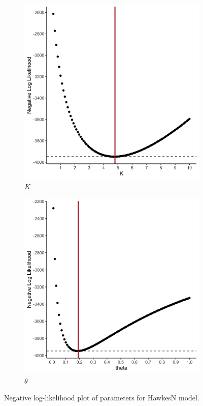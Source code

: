 \documentclass[12pt]{article}
\begin{document}
\begin{figure}
\centering
\begin{subfigure}{.5\textwidth}
  \centering
  \includegraphics[width=0.9\linewidth]{../figures/HawkesN_neg-log-likelihood-plot_K.png}
  \caption{$K$}
\end{subfigure}%
\begin{subfigure}{.5\textwidth}
  \centering
  \includegraphics[width=0.9\linewidth]{../figures/HawkesN_neg-log-likelihood-plot_theta.png}
  \caption{$\theta$}
\end{subfigure}
\caption{Negative log-likelihood plot of parameters for HawkesN model. }\label{fig:HawkesN-ll}
\end{figure}
\end{document}
